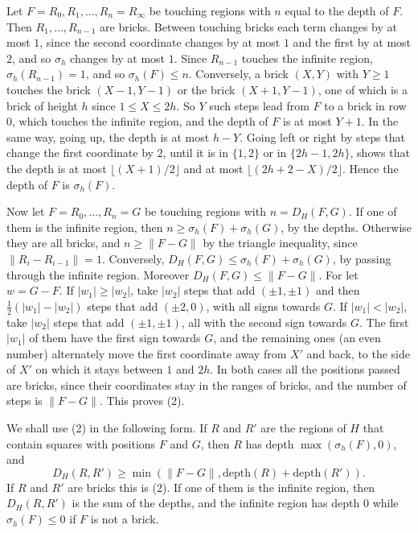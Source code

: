 {Let $F = R_0, R_1, \dots, R_n = R_\infty$ be touching regions with $n$ equal to the depth of $F$. Then $R_1, \dots, R_{n-1}$ are bricks. Between touching bricks each term changes by at most $1$, since the second coordinate changes by at most $1$ and the first by at most $2$, and so $\sigma_h$ changes by at most $1$. Since $R_{n-1}$ touches the infinite region, $\sigma_h(R_{n-1}) = 1$, and so $\sigma_h(F) \le n$. Conversely, a brick $(X, Y)$ with $Y \ge 1$ touches the brick $(X - 1, Y - 1)$ or the brick $(X + 1, Y - 1)$, one of which is a brick of height $h$ since $1 \le X \le 2h$. So $Y$ such steps lead from $F$ to a brick in row $0$, which touches the infinite region, and the depth of $F$ is at most $Y + 1$. In the same way, going up, the depth is at most $h - Y$. Going left or right by steps that change the first coordinate by $2$, until it is in $\{1, 2\}$ or in $\{2h - 1, 2h\}$, shows that the depth is at most $\lfloor (X + 1)/2 \rfloor$ and at most $\lfloor (2h + 2 - X)/2 \rfloor$. Hence the depth of $F$ is $\sigma_h(F)$.

Now let $F = R_0, \dots, R_n = G$ be touching regions with $n = D_H(F, G)$. If one of them is the infinite region, then $n \ge \sigma_h(F) + \sigma_h(G)$, by the depths. Otherwise they are all bricks, and $n \ge \|F - G\|$ by the triangle inequality, since $\|R_i - R_{i-1}\| = 1$. Conversely, $D_H(F, G) \le \sigma_h(F) + \sigma_h(G)$, by passing through the infinite region. Moreover $D_H(F, G) \le \|F - G\|$. For let $w = G - F$. If $|w_1| \ge |w_2|$, take $|w_2|$ steps that add $(\pm 1, \pm 1)$ and then $\frac{1}{2}(|w_1| - |w_2|)$ steps that add $(\pm 2, 0)$, with all signs towards $G$. If $|w_1| < |w_2|$, take $|w_2|$ steps that add $(\pm 1, \pm 1)$, all with the second sign towards $G$. The first $|w_1|$ of them have the first sign towards $G$, and the remaining ones (an even number) alternately move the first coordinate away from $X'$ and back, to the side of $X'$ on which it stays between $1$ and $2h$. In both cases all the positions passed are bricks, since their coordinates stay in the ranges of bricks, and the number of steps is $\|F - G\|$. This proves (2).

We shall use (2) in the following form. If $R$ and $R'$ are the regions of $H$ that contain squares with positions $F$ and $G$, then $R$ has depth $\max(\sigma_h(F), 0)$, and
\begin{equation*}
D_H(R, R') \ge \min(\|F - G\|, \text{depth}(R) + \text{depth}(R')).
\end{equation*}
If $R$ and $R'$ are bricks this is (2). If one of them is the infinite region, then $D_H(R, R')$ is the sum of the depths, and the infinite region has depth $0$ while $\sigma_h(F) \le 0$ if $F$ is not a brick.

}
